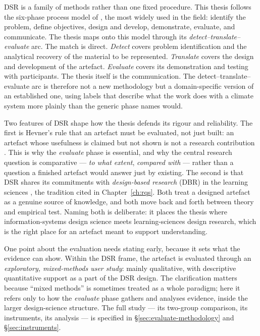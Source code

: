 DSR is a family of methods rather than one fixed procedure. This thesis follows the six-phase process model of \citet{peffers2007}, the most widely used in the field: identify the problem, define objectives, design and develop, demonstrate, evaluate, and communicate. The thesis maps onto this model through its \emph{detect--translate--evaluate} arc. The match is direct. \emph{Detect} covers problem identification and the analytical recovery of the material to be represented. \emph{Translate} covers the design and development of the artefact. \emph{Evaluate} covers its demonstration and testing with participants. The thesis itself is the communication. The detect--translate--evaluate arc is therefore not a new methodology but a domain-specific version of an established one, using labels that describe what the work does with a climate system more plainly than the generic phase names would.

Two features of DSR shape how the thesis defends its rigour and reliability. The first is Hevner's rule that an artefact must be evaluated, not just built: an artefact whose usefulness is claimed but not shown is not a research contribution \citep{hevner2004}. This is why the \emph{evaluate} phase is essential, and why the central research question is comparative --- \emph{to what extent}, \emph{compared with} --- rather than a question a finished artefact would answer just by existing. The second is that DSR shares its commitments with \emph{design-based research} (DBR) in the learning sciences \citep{barab2004, andersonshattuck2012}, the tradition cited in Chapter~\ref{ch:rqs}. Both treat a designed artefact as a genuine source of knowledge, and both move back and forth between theory and empirical test. Naming both is deliberate: it places the thesis where information-systems design science meets learning-sciences design research, which is the right place for an artefact meant to support understanding.

One point about the evaluation needs stating early, because it sets what the evidence can show. Within the DSR frame, the artefact is evaluated through an \emph{exploratory, mixed-methods user study}: mainly qualitative, with descriptive quantitative support as a part of the DSR design. The clarification matters because ``mixed methods'' is sometimes treated as a whole paradigm; here it refers only to how the \emph{evaluate} phase gathers and analyses evidence, inside the larger design-science structure. The full study --- its two-group comparison, its instruments, its analysis --- is specified in \S\ref{sec:evaluate-methodology} and \S\ref{sec:instruments}.

